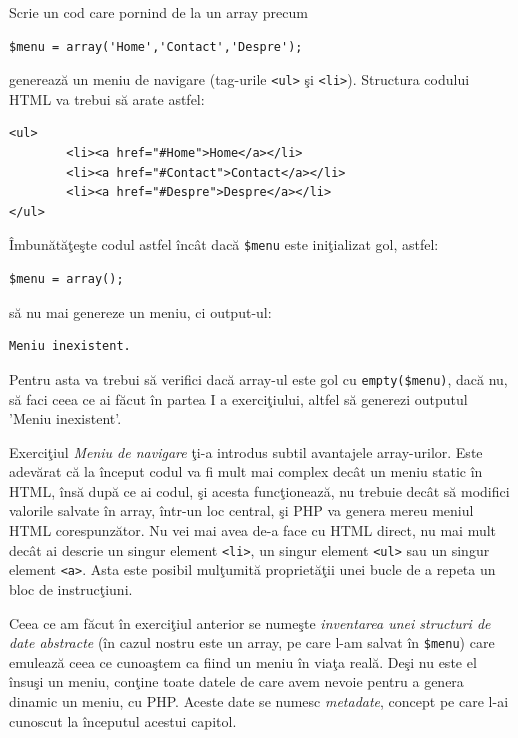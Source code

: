\begin{Exercise}[title={Meniu de navigare},difficulty=1]

\ExePart

Scrie un cod care pornind de la un array precum
\begin{lstlisting}
$menu = array('Home','Contact','Despre');
\end{lstlisting}
generează un meniu de navigare (tag-urile \texttt{<ul>} şi \texttt{<li>}).
Structura codului HTML va trebui să arate astfel:
\begin{verbatim}
<ul>
        <li><a href="#Home">Home</a></li>
        <li><a href="#Contact">Contact</a></li>
        <li><a href="#Despre">Despre</a></li>
</ul>
\end{verbatim}

\ExePart
Îmbunătăţeşte codul astfel încât dacă \texttt{\$menu} este iniţializat gol, astfel:
\begin{lstlisting}
$menu = array();
\end{lstlisting}
să nu mai genereze un meniu, ci output-ul:
\begin{verbatim}
Meniu inexistent.
\end{verbatim}
Pentru asta va trebui să verifici dacă array-ul este gol cu \texttt{empty(\$menu)}, dacă
nu, să faci ceea ce ai făcut în partea I a exerciţiului, altfel să generezi
outputul 'Meniu inexistent'.
\end{Exercise}
Exerciţiul \textit{Meniu de navigare} ţi-a introdus subtil avantajele
array-urilor. Este adevărat că la început codul va fi mult mai
complex decât un meniu static în HTML, însă după ce ai codul, şi
acesta funcţionează, nu trebuie decât să modifici valorile salvate
în array, într-un loc {\glqq}central{\grqq}, şi PHP va genera mereu meniul HTML corespunzător.
Nu vei mai avea de-a face cu HTML direct, nu mai mult decât ai descrie un singur element
\texttt{<li>}, un singur element \texttt{<ul>} sau un singur element \texttt{<a>}.
Asta este posibil mulţumită proprietăţii unei bucle de a repeta un bloc de instrucţiuni.

Ceea ce am făcut în exerciţiul anterior
se numeşte \textit{inventarea unei structuri de date abstracte} (în cazul
nostru este un array, pe care
l-am salvat în \texttt{\$menu}) care emulează ceea ce cunoaştem ca fiind un {\glqq}meniu{\grqq} în {\glqq}viaţa reală{\grqq}.
Deşi nu este el însuşi un meniu, conţine toate datele de care avem nevoie
pentru a genera dinamic un meniu, cu PHP. Aceste date se numesc \textsl{metadate},
concept pe care l-ai cunoscut la începutul acestui capitol.

